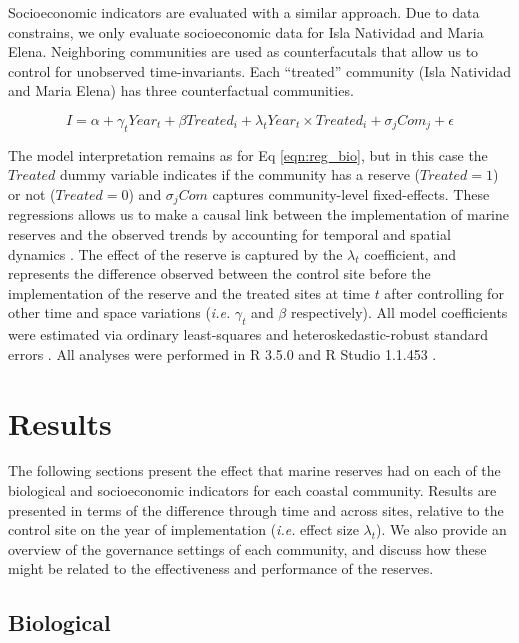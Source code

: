 \documentclass{frontiersSCNS}
\begin{document}
Socioeconomic indicators are evaluated with a similar approach. Due to
data constrains, we only evaluate socioeconomic data for Isla Natividad
and Maria Elena. Neighboring communities are used as counterfacutals
that allow us to control for unobserved time-invariants. Each
``treated'' community (Isla Natividad and Maria Elena) has three
counterfactual communities.

\begin{equation}
I = \alpha + \gamma_{t} Year_t + \beta Treated_i + \lambda_{t} Year_t\times Treated_i + \sigma_jCom_j +\epsilon
\label{eqn:soc_reg}
\end{equation}

The model interpretation remains as for Eq \ref{eqn:reg_bio}, but in
this case the \(Treated\) dummy variable indicates if the community has
a reserve (\(Treated = 1\)) or not (\(Treated = 0\)) and \(\sigma_jCom\)
captures community-level fixed-effects. These regressions allows us to
make a causal link between the implementation of marine reserves and the
observed trends by accounting for temporal and spatial dynamics
\citep{depalma_2018}. The effect of the reserve is captured by the
\(\lambda_t\) coefficient, and represents the difference observed
between the control site before the implementation of the reserve and
the treated sites at time \(t\) after controlling for other time and
space variations (\emph{i.e.} \(\gamma_t\) and \(\beta\) respectively).
All model coefficients were estimated via ordinary least-squares and
heteroskedastic-robust standard errors \citep{zeileis_2004-7n}. All
analyses were performed in R 3.5.0 and R Studio 1.1.453 \citep{R_2018}.

\section{Results}\label{results}

The following sections present the effect that marine reserves had on
each of the biological and socioeconomic indicators for each coastal
community. Results are presented in terms of the difference through time
and across sites, relative to the control site on the year of
implementation (\emph{i.e.} effect size \(\lambda_t\)). We also provide
an overview of the governance settings of each community, and discuss
how these might be related to the effectiveness and performance of the
reserves.

\subsection{Biological}\label{biological}
\end{document}
